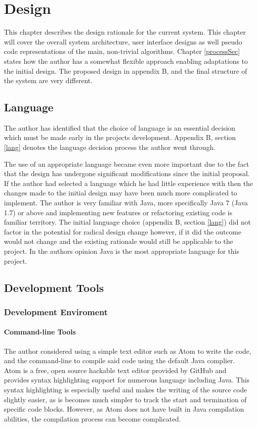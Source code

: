 \chapter{Design}
\label{DesignSec}
This chapter describes the design rationale for the current system. This chapter will cover the overall system architecture, user interface designs as well pseudo code representations of the main, non-trivial algorithms. Chapter \ref{processSec} states how the author has a somewhat flexible approach enabling adaptations to the initial design. The proposed design in appendix B, and the final structure of the system are very different.

\section{Language}

The author has identified that the choice of language is an essential decision which must be made early in the projects development. Appendix B, section \ref{lang} denotes the language decision process the author went through.

The use of an appropriate language became even more important due to the fact that the design has undergone significant modifications since the initial proposal. If the author had selected a language which he had little experience with then the changes made to the initial design may have been much more complicated to implement. The author is very familiar with Java, more specifically Java 7 (Java 1.7) or above and implementing new features or refactoring existing code is familiar territory. The initial language choice (appendix B, section \ref{lang}) did not factor in the potential for radical design change however, if it did the outcome would not change and the existing rationale would still be applicable to the project. In the authors opinion Java is the most appropriate language for this project.

\section{Development Tools}
\subsection{Development Enviroment}

\subsubsection{Command-line Tools}
\label{sseccmd}
The author considered using a simple text editor such as Atom\cite{atom:textEditor} to write the code, and the command-line to compile said code using the default Java complier. Atom is a free, open source hackable text editor provided by GitHub and provides syntax highlighting support for numerous language including Java. This syntax highlighting is especially useful and makes the writing of the source code slightly easier, as is becomes much simpler to track the start and termination of specific code blocks. However, as Atom does not have built in Java compilation abilities, the compilation process can become complicated.


